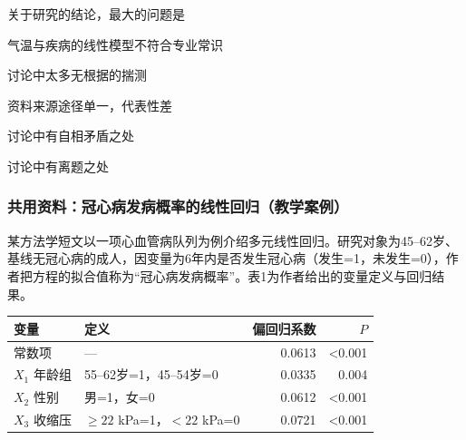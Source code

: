 \par\addvspace{6pt}\noindent\begin{minipage}{\linewidth}


关于研究的结论，最大的问题是


\begin{choices}

\item 气温与疾病的线性模型不符合专业常识

\item 讨论中太多无根据的揣测

\item 资料来源途径单一，代表性差

\item 讨论中有自相矛盾之处

\item 讨论中有离题之处

\end{choices}

\end{minipage}\par\vspace{4pt}

\subsubsection*{共用资料：冠心病发病概率的线性回归（教学案例）}

某方法学短文以一项心血管病队列为例介绍多元线性回归。研究对象为45--62岁、基线无冠心病的成人，因变量为6年内是否发生冠心病（发生=1，未发生=0），作者把方程的拟合值称为``冠心病发病概率''。表1为作者给出的变量定义与回归结果。

\begin{center}\small\setlength{\tabcolsep}{4pt}\renewcommand{\arraystretch}{1.18}\begin{tabular}{@{}llrr@{}}
\toprule
变量 & 定义 & 偏回归系数 & \(P\) \\
\midrule
常数项 & --- & 0.0613 & \textless0.001 \\
\(X_1\) 年龄组 & 55--62岁=1，45--54岁=0 & 0.0335 & 0.004 \\
\(X_2\) 性别 & 男=1，女=0 & 0.0612 & \textless0.001 \\
\(X_3\) 收缩压 & \(\ge22\) kPa=1，\(<22\) kPa=0 & 0.0721 & \textless0.001 \\
\bottomrule\end{tabular}\end{center}


